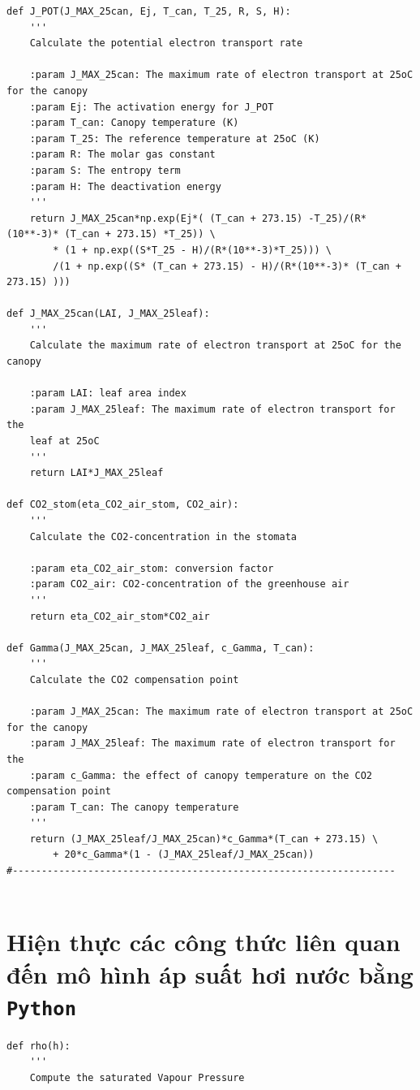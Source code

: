 \documentclass[a4paper]{article}
\begin{document}
\begin{appendices}
\begin{verbatim}
def J_POT(J_MAX_25can, Ej, T_can, T_25, R, S, H):
    '''
    Calculate the potential electron transport rate

    :param J_MAX_25can: The maximum rate of electron transport at 25oC for the canopy
    :param Ej: The activation energy for J_POT
    :param T_can: Canopy temperature (K)
    :param T_25: The reference temperature at 25oC (K)
    :param R: The molar gas constant
    :param S: The entropy term
    :param H: The deactivation energy
    '''
    return J_MAX_25can*np.exp(Ej*( (T_can + 273.15) -T_25)/(R*(10**-3)* (T_can + 273.15) *T_25)) \
        * (1 + np.exp((S*T_25 - H)/(R*(10**-3)*T_25))) \
        /(1 + np.exp((S* (T_can + 273.15) - H)/(R*(10**-3)* (T_can + 273.15) )))

def J_MAX_25can(LAI, J_MAX_25leaf):
    '''
    Calculate the maximum rate of electron transport at 25oC for the canopy

    :param LAI: leaf area index
    :param J_MAX_25leaf: The maximum rate of electron transport for the
    leaf at 25oC
    '''
    return LAI*J_MAX_25leaf

def CO2_stom(eta_CO2_air_stom, CO2_air):
    '''
    Calculate the CO2-concentration in the stomata

    :param eta_CO2_air_stom: conversion factor
    :param CO2_air: CO2-concentration of the greenhouse air
    '''
    return eta_CO2_air_stom*CO2_air

def Gamma(J_MAX_25can, J_MAX_25leaf, c_Gamma, T_can):
    '''
    Calculate the CO2 compensation point

    :param J_MAX_25can: The maximum rate of electron transport at 25oC for the canopy
    :param J_MAX_25leaf: The maximum rate of electron transport for the
    :param c_Gamma: the effect of canopy temperature on the CO2 compensation point
    :param T_can: The canopy temperature
    '''
    return (J_MAX_25leaf/J_MAX_25can)*c_Gamma*(T_can + 273.15) \
        + 20*c_Gamma*(1 - (J_MAX_25leaf/J_MAX_25can))
#------------------------------------------------------------------


\end{verbatim}

\section{Hiện thực các công thức liên quan đến mô hình áp suất hơi nước bằng \texttt{Python}}\label{appendixB}
\begin{verbatim}
def rho(h):
    '''
    Compute the saturated Vapour Pressure


\end{verbatim}
\end{appendices}
\end{document}
